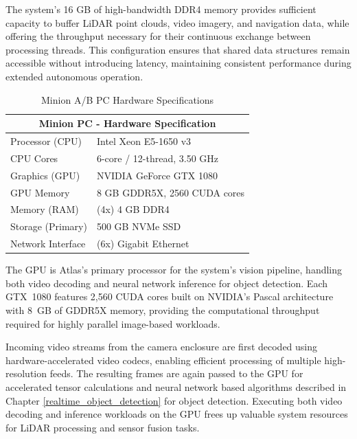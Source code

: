 \documentclass[../main.tex]{subfiles}
\begin{document}
The system’s 16 GB of high-bandwidth DDR4 memory provides sufficient capacity to buffer LiDAR point clouds, video imagery, and navigation data, while offering the throughput necessary for their continuous exchange between processing threads.  
This configuration ensures that shared data structures remain accessible without introducing latency, maintaining consistent performance during extended autonomous operation. 

\begin{table}[htpb]
\centering
\begin{tabular}{ll}
\hline
\multicolumn{2}{c}{Minion PC - Hardware Specification} \\
\hline
\hline
Processor (CPU) & Intel Xeon E5-1650 v3 \\
CPU Cores & 6-core / 12-thread, 3.50 GHz \\
Graphics (GPU) & NVIDIA GeForce GTX 1080 \\
GPU Memory & 8 GB GDDR5X, 2560 CUDA cores \\
Memory (RAM) & (4x) 4 GB DDR4 \\
Storage (Primary) & 500 GB NVMe SSD \\
Network Interface & (6x) Gigabit Ethernet \\%
\hline
\end{tabular}
\caption{Minion A/B PC Hardware Specifications}
\label{table:Minion_hardware}
\end{table}


The GPU is Atlas's primary processor for the system’s vision pipeline, handling both video decoding and neural network inference for object detection.
Each GTX~1080 features 2,560 CUDA cores built on NVIDIA’s Pascal architecture with 8~GB of GDDR5X memory, providing the computational throughput required for highly parallel image-based workloads.  
  
Incoming video streams from the camera enclosure are first decoded using hardware-accelerated video codecs, enabling efficient processing of multiple high-resolution feeds.
The resulting frames are again passed to the GPU for accelerated tensor calculations and neural network based algorithms described in Chapter \ref{realtime_object_detection} for object detection.
Executing both video decoding and inference workloads on the GPU frees up valuable system resources for LiDAR processing and sensor fusion tasks.
\end{document}
